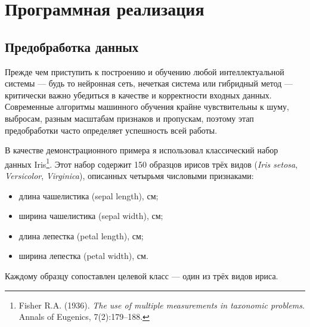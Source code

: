 \section{Программная реализация}

\subsection{Предобработка данных}

Прежде чем приступить к построению и обучению любой интеллектуальной системы — будь то нейронная сеть, нечеткая система или гибридный метод — критически важно убедиться в качестве и корректности входных данных. Современные алгоритмы машинного обучения крайне чувствительны к шуму, выбросам, разным масштабам признаков и пропускам, поэтому этап предобработки часто определяет успешность всей работы.

В качестве демонстрационного примера я использовал классический набор данных Iris\footnote{Fisher R.A. (1936). \emph{The use of multiple measurements in taxonomic problems}. Annals of Eugenics, 7(2):179–188.}. Этот набор содержит 150 образцов ирисов трёх видов (\emph{Iris setosa}, \emph{Versicolor}, \emph{Virginica}), описанных четырьмя числовыми признаками:
\begin{itemize}
  \item длина чашелистика (sepal length), см;
  \item ширина чашелистика (sepal width), см;
  \item длина лепестка (petal length), см;
  \item ширина лепестка (petal width), см.
\end{itemize}
Каждому образцу сопоставлен целевой класс — один из трёх видов ириса.

